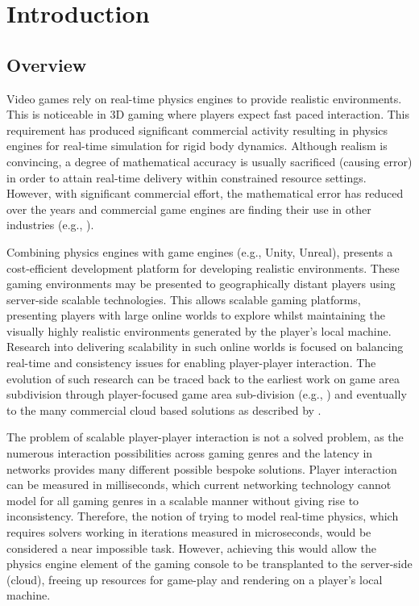 \chapter{Introduction}

\section{Overview}
Video games rely on real-time physics engines to provide realistic environments. This is noticeable in 3D gaming where players expect fast paced interaction. This requirement has produced significant commercial activity resulting in physics engines for real-time simulation for rigid body dynamics. Although realism is convincing, a degree of mathematical accuracy is usually sacrificed (causing error) in order to attain real-time delivery within constrained resource settings. However, with significant commercial effort, the mathematical error has reduced over the years and commercial game engines are finding their use in other industries (e.g.,  \cite{Xu2017, Lu2017, Shah2018}).

Combining physics engines with game engines (e.g., Unity, Unreal), presents a cost-efficient development platform for developing realistic environments. These gaming environments may be presented to geographically distant players using server-side scalable technologies. This allows scalable gaming platforms, presenting players with large online worlds to explore whilst maintaining the visually highly realistic environments generated by the player's local machine. Research into delivering scalability in such online worlds is focused on balancing real-time and consistency issues for enabling player-player interaction. The evolution of such research can be traced back to the earliest work on game area subdivision \cite{Npsnet} through player-focused game area sub-division (e.g., \cite{Morgan2005InterestManagement, Greenhalgh}) and eventually to the many commercial cloud based solutions as described by \cite{iCloudAccess}.

The problem of scalable player-player interaction is not a solved problem, as the numerous interaction possibilities across gaming genres and the latency in networks provides many different possible bespoke solutions. Player interaction can be measured in milliseconds, which current networking technology cannot model for all gaming genres in a scalable manner without giving rise to inconsistency. Therefore, the notion of trying to model real-time physics, which requires solvers working in iterations measured in microseconds, would be considered a near impossible task. However, achieving this would allow the physics engine element of the gaming console to be transplanted to the server-side (cloud), freeing up resources for game-play and rendering on a player's local machine.

